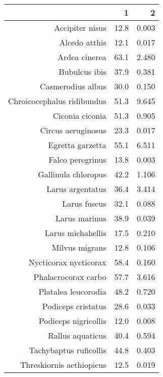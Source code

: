\begin{table}[ht]
\centering
\begin{tabular}{rrr}
  \hline
 & 1 & 2 \\ 
  \hline
Accipiter nisus & 12.8 & 0.003 \\ 
  Alcedo atthis & 12.1 & 0.017 \\ 
  Ardea cinerea & 63.1 & 2.480 \\ 
  Bubulcus ibis & 37.9 & 0.381 \\ 
  Casmerodius albus & 30.0 & 0.150 \\ 
  Chroicocephalus ridibundus & 51.3 & 9.645 \\ 
  Ciconia ciconia & 51.3 & 0.905 \\ 
  Circus aeruginosus & 23.3 & 0.017 \\ 
  Egretta garzetta & 55.1 & 6.511 \\ 
  Falco peregrinus & 13.8 & 0.003 \\ 
  Gallinula chloropus & 42.2 & 1.106 \\ 
  Larus argentatus & 36.4 & 3.414 \\ 
  Larus fuscus & 32.1 & 0.088 \\ 
  Larus marinus & 38.9 & 0.039 \\ 
  Larus michahellis & 17.5 & 0.210 \\ 
  Milvus migrans & 12.8 & 0.106 \\ 
  Nycticorax nycticorax & 58.4 & 0.160 \\ 
  Phalacrocorax carbo & 57.7 & 3.616 \\ 
  Platalea leucorodia & 48.2 & 0.720 \\ 
  Podiceps cristatus & 28.6 & 0.033 \\ 
  Podiceps nigricollis & 12.0 & 0.008 \\ 
  Rallus aquaticus & 40.4 & 0.594 \\ 
  Tachybaptus ruficollis & 44.8 & 0.403 \\ 
  Threskiornis aethiopicus & 12.5 & 0.019 \\ 
   \hline
\end{tabular}
\end{table}
